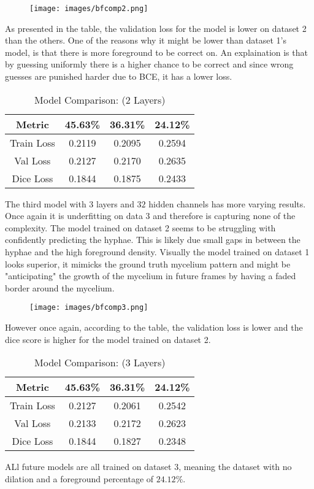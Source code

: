 \documentclass[a4paper,12pt]{article}
\begin{document}
\begin{figure}[H]
  \centering
  \texttt{[image: images/bfcomp2.png]}
  \caption{} %
  \label{fig:n15}
\end{figure}
As presented in the table, the validation loss for the model is lower on dataset 2 than the others. One of the reasons why it might be lower than dataset 1's model, is that there is more foreground to be correct on. An explaination is that by guessing uniformly there is a higher chance to be correct and since wrong guesses are punished harder due to BCE, it has a lower loss.

\begin{table}[H]
  \centering
  \caption{Model Comparison: (2 Layers)}
  \begin{tabular}{|c|c|c|c|}
  \hline
  Metric & 45.63\% & 36.31\% & 24.12\% \\
  \hline
  Train Loss & 0.2119 & 0.2095 & 0.2594 \\
  Val Loss   & 0.2127 & 0.2170 & 0.2635 \\
  Dice Loss  & 0.1844 & 0.1875 & 0.2433 \\
  \hline
  \end{tabular}
\end{table}
The third model with $3$ layers and $32$ hidden channels has more varying results. Once again it is underfitting on data 3 and therefore is capturing none of the complexity. The model trained on dataset 2 seems to be struggling with confidently predicting the hyphae. This is likely due small gaps in between the hyphae and the high foreground density. Visually the model trained on dataset 1 looks superior, it mimicks the ground truth mycelium pattern and might be "anticipating" the growth of the mycelium in future frames by having a faded border around the mycelium. 
\begin{figure}[H]
  \centering
  \texttt{[image: images/bfcomp3.png]}
  \caption{} %
  \label{fig:n16}
\end{figure}
However once again, according to the table, the validation loss is lower and the dice score is higher for the model trained on dataset 2.
\begin{table}[H]
  \centering
  \caption{Model Comparison: (3 Layers)}
  \begin{tabular}{|c|c|c|c|}
  \hline
  Metric & 45.63\% & 36.31\% & 24.12\% \\
  \hline
  Train Loss & 0.2127 & 0.2061 & 0.2542 \\
  Val Loss   & 0.2133 & 0.2172 & 0.2623 \\
  Dice Loss  & 0.1844 & 0.1827 & 0.2348 \\
  \hline
  \end{tabular}
\end{table}
ALl future models are all trained on dataset 3, meaning the dataset with no dilation and a foreground percentage of $24.12\%$.
\end{document}
